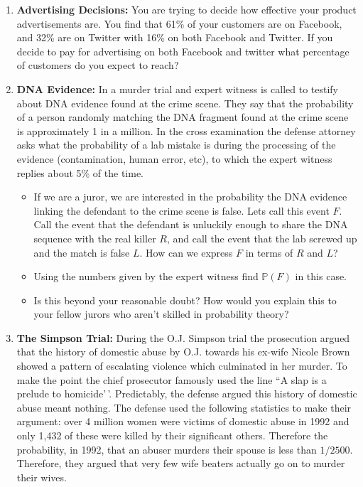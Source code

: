 \documentclass[
]{book}
\providecommand{\tightlist}{%
  \setlength{\itemsep}{0pt}\setlength{\parskip}{0pt}}
\newcommand{\prob}[1]{{\mathbb{P}(#1)}}
\theoremstyle{definition}
\theoremstyle{definition}
\theoremstyle{definition}
\theoremstyle{definition}
\theoremstyle{remark}
\begin{document}
\begin{enumerate}
\def\labelenumi{\arabic{enumi}.}
\item
  \textbf{Advertising Decisions:} You are trying to decide how effective your product advertisements are. You find that 61\% of your customers are on Facebook, and 32\% are on Twitter with 16\% on both Facebook and Twitter. If you decide to pay for advertising on both Facebook and twitter what percentage of customers do you expect to reach?
\item
  \textbf{DNA Evidence:} In a murder trial and expert witness is called to testify about DNA evidence found at the crime scene. They say that the probability of a person randomly matching the DNA fragment found at the crime scene is approximately 1 in a million. In the cross examination the defense attorney asks what the probability of a lab mistake is during the processing of the evidence (contamination, human error, etc), to which the expert witness replies about 5\% of the time.

  \begin{itemize}
  \tightlist
  \item
    If we are a juror, we are interested in the probability the DNA evidence linking the defendant to the crime scene is false. Lets call this event \(F\). Call the event that the defendant is unluckily enough to share the DNA sequence with the real killer \(R\), and call the event that the lab screwed up and the match is false \(L\). How can we express \(F\) in terms of \(R\) and \(L\)?
  \item
    Using the numbers given by the expert witness find \(\prob{F}\) in this case.
  \item
    Is this beyond your reasonable doubt? How would you explain this to your fellow jurors who aren't skilled in probability theory?
  \end{itemize}
\item
  \textbf{The Simpson Trial:} During the O.J. Simpson trial the prosecution argued that the history of domestic abuse by O.J. towards his ex-wife Nicole Brown showed a pattern of escalating violence which culminated in her murder. To make the point the chief prosecutor famously used the line ``A slap is a prelude to homicide'\,'. Predictably, the defense argued this history of domestic abuse meant nothing. The defense used the following statistics to make their argument: over 4 million women were victims of domestic abuse in 1992 and only 1,432 of these were killed by their significant others. Therefore the probability, in 1992, that an abuser murders their spouse is less than \(1/2500\). Therefore, they argued that very few wife beaters actually go on to murder their wives.


\end{enumerate}
\end{document}
